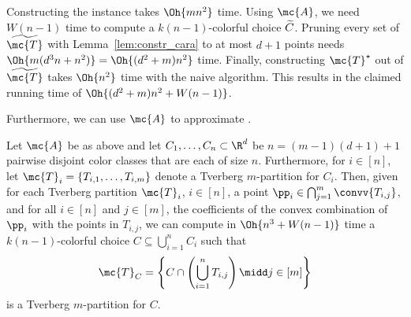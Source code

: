 \begin{prf}
Constructing the \CCP instance takes $\Oh{m n^2}$ time.
Using $\mc{A}$, we need $W(n-1)$ time to compute a $k(n-1)$-colorful choice
$\widetilde{C}$. Pruning every set of $\kch{\mc{T}}$ with 
Lemma~\ref{lem:constr_cara} to
at most $d+1$ points needs $\Oh{m (d^3 n + n^2)}=\Oh{(d^2 + m) n^2}$ time.
Finally, constructing
$\mc{T}^\star$ out of $\kch{\mc{T}}$ takes $\Oh{n^2}$ time with the naive
algorithm. This results in the claimed running time of
$\Oh{(d^2 + m) n^2 + W(n-1)}$.
\end{prf}

Furthermore, we can use $\mc{A}$ to approximate \ColKirchberger.

\begin{corollary}\label{cor:app:colkirchberger}
Let $\mc{A}$ be as above and let $C_1,\dots, C_n \subset \R^d$ be
$n=(m-1)(d+1)+1$ pairwise disjoint color
classes that are each of size $n$. Furthermore, for $i \in [n]$, let
$\mc{T}_i = \left\{T_{i,1},\dots,T_{i,m} \right\}$ denote a Tverberg
$m$-partition for $C_i$.
Then, given for each Tverberg partition $\mc{T}_i$, $i \in [n]$, a 
point $\pp_i
\in \bigcap_{j=1}^m \convv{T_{i,j}}$, and for all $i \in [n]$ and 
$j \in [m]$, the coefficients of the
convex combination of $\pp_i$ with the points in $T_{i,j}$,
we can compute in $\Oh{n^3 + W(n-1)}$ time a
$k(n-1)$-colorful choice $C\subseteq \bigcup_{i=1}^n C_i$ such that
\[
  \mc{T}_{C} = \left\{ C \cap \left( \bigcup_{i=1}^n T_{i,j} \right) \midd j \in
  [m] \right\}
\]
is a Tverberg $m$-partition for $C$.
\end{corollary}
